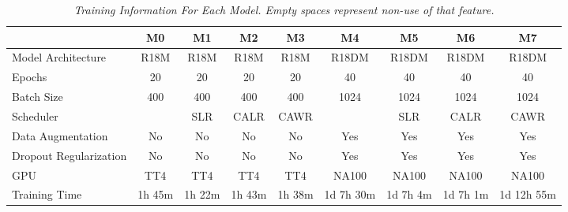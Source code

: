 \documentclass[dvipsnames,mathserif]{beamer}
\begin{document}
{\begin{frame}
    \end{frame}

    \begin{frame}


      \begin{table}

        \centering
        \begin{adjustbox}{width=\textwidth}
          \begin{tabular}{lcccccccc}
            \toprule
      & \textbf{M0} & \textbf{M1} & \textbf{M2} & \textbf{M3} & \textbf{M4} & \textbf{M5} & \textbf{M6} & \textbf{M7} \\
      \midrule
            Model Architecture & R18M & R18M & R18M & R18M & R18DM & R18DM & R18DM & R18DM \\
            Epochs & 20 & 20 & 20 & 20 & 40 & 40 & 40 & 40 \\
            Batch Size & 400 & 400 & 400 & 400 & 1024 & 1024 & 1024 & 1024 \\
            Scheduler & & SLR & CALR & CAWR &  & SLR & CALR & CAWR  \\
            Data Augmentation & No & No & No & No  & Yes & Yes & Yes & Yes \\
            Dropout Regularization & No & No & No & No  & Yes & Yes & Yes & Yes \\
            GPU & TT4 & TT4 & TT4 & TT4 & NA100 & NA100 & NA100 & NA100 \\
            Training Time & 1h 45m & 1h 22m & 1h 43m & 1h 38m & 1d 7h 30m & 1d 7h 4m & 1d 7h 1m & 1d 12h 55m \\ \bottomrule
          \end{tabular}
        \end{adjustbox}
        \caption[Training Information For Each Model.]
        {\textit{\footnotesize{Training Information For Each Model. Empty spaces represent non-use of that feature.}}}
        {\label{table:trained-models-information}}
      \end{table}

    \end{frame}


    \begin{frame}


\end{frame}}
\end{document}

